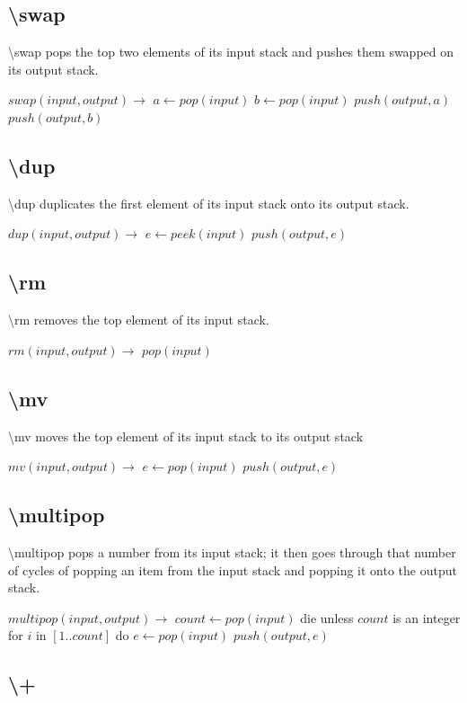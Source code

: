 \documentclass{article}
\let\bs\textbackslash
\def\pc{\bigskip\obeylines\parindent=0pt}
\begin{document}
{{{{{\subsection{\bs swap}
\bs swap pops the top two elements of its input stack and pushes them swapped on its output stack.

{\pc
$swap(input,output) \rightarrow$
\quad $a \leftarrow pop(input)$
\quad $b \leftarrow pop(input)$
\quad $push(output, a)$
\quad $push(output, b)$
}

\subsection{\bs dup}
\bs dup duplicates the first element of its input stack onto its output stack.

{\pc
$dup(input,output) \rightarrow$
\quad $e \leftarrow peek(input)$
\quad $push(output, e)$
}

\subsection{\bs rm}
\bs rm removes the top element of its input stack.

{\pc $rm(input,output) \rightarrow $
\quad $pop(input)$}

\subsection{\bs mv}
\bs mv moves the top element of its input stack to its output stack

{\pc $mv(input, output) \rightarrow$
\quad $e \leftarrow pop(input)$
\quad $push(output, e)$
}

\subsection{\bs multipop}

\bs multipop pops a number from its input stack; it then goes through that number of cycles of popping an item from the input stack and popping it onto the output stack.

{\pc $multipop(input,output) \rightarrow$
\quad $count \leftarrow pop(input)$
\quad die unless $count$ is an integer
\quad for $i$ in $[1..count]$ do
\quad \quad $e \leftarrow pop(input)$
\quad \quad $push(output, e)$
}

\subsection{\bs +}

}}}}}
\end{document}
